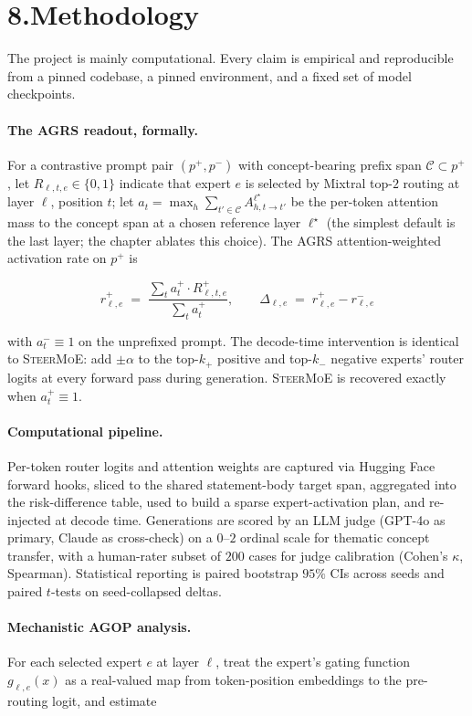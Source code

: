 \documentclass[11pt]{article}
\begin{document}
\section*{8.\quad Methodology}

The project is mainly computational. Every claim is empirical and
reproducible from a pinned codebase, a pinned environment, and a
fixed set of model checkpoints.

\paragraph{The AGRS readout, formally.}
For a contrastive prompt pair $(p^+, p^-)$ with concept-bearing
prefix span $\mathcal{C} \subset p^+$, let
$R_{\ell, t, e} \in \{0, 1\}$ indicate that expert $e$ is selected
by Mixtral top-$2$ routing at layer $\ell$, position $t$; let
$a_t = \max_h \sum_{t' \in \mathcal{C}} A^{\ell^\star}_{h, t \to t'}$
be the per-token attention mass to the concept span at a chosen
reference layer $\ell^\star$ (the simplest default is the last
layer; the chapter ablates this choice). The AGRS attention-weighted
activation rate on $p^+$ is

\[
r^+_{\ell, e}
\;=\;
\frac{\sum_t a^+_t \cdot R^+_{\ell, t, e}}
     {\sum_t a^+_t},
\qquad
\Delta_{\ell, e} \;=\; r^+_{\ell, e} - r^-_{\ell, e}
\]

with $a^-_t \equiv 1$ on the unprefixed prompt. The decode-time
intervention is identical to \textsc{SteerMoE}: add $\pm \alpha$ to
the top-$k_+$ positive and top-$k_-$ negative experts' router
logits at every forward pass during generation.
\textsc{SteerMoE} is recovered exactly when $a^+_t \equiv 1$.

\paragraph{Computational pipeline.}
Per-token router logits and attention weights are captured via
Hugging Face forward hooks, sliced to the shared statement-body
target span, aggregated into the risk-difference table, used to
build a sparse expert-activation plan, and re-injected at decode
time. Generations are scored by an LLM judge (GPT-4o as primary,
Claude as cross-check) on a $0$--$2$ ordinal scale for thematic
concept transfer, with a human-rater subset of $200$ cases for
judge calibration (Cohen's $\kappa$, Spearman). Statistical
reporting is paired bootstrap $95\%$ CIs across seeds and
paired $t$-tests on seed-collapsed deltas.

\paragraph{Mechanistic AGOP analysis.}
For each selected expert $e$ at layer $\ell$, treat the expert's
gating function $g_{\ell, e}(x)$ as a real-valued map from
token-position embeddings to the pre-routing logit, and estimate
\end{document}
